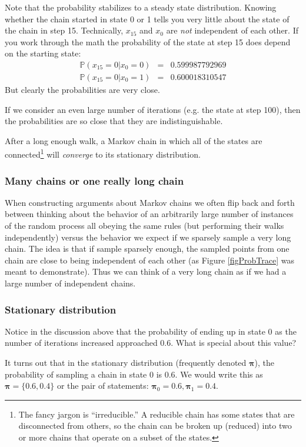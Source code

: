 \documentclass[11pt]{article}
\renewcommand{\Pr}{{\mathbb P}}
\begin{document}
Note that the probability stabilizes to a steady state distribution.
Knowing whether the chain started in state 0 or 1 tells you very little about the state of the chain in step 15.
Technically, $x_{15}$ and $x_0$ are {\em not} independent of each other.
If you work through the math the probability of the state at step 15 does depend on the starting state:
\begin{eqnarray*}
	\Pr(x_{15} = 0 | x_0 = 0) & = & 0.599987792969\\
	\Pr(x_{15} = 0 | x_0 = 1) & = & 0.600018310547
\end{eqnarray*}
But clearly the probabilities are very close.

If we consider an even large number of iterations (e.g. the state at step 100), then the probabilities are so close that they are indistinguishable.

After a long enough walk, a Markov chain in which all of the states are connected\footnote{The fancy jargon is ``irreducible.'' A reducible chain has some states that are disconnected from others, so the chain can be broken up (reduced) into two or more chains that operate on a subset of the states.} will {\em converge} to its stationary distribution.

\subsubsection*{Many chains or one really long chain}
When constructing arguments about Markov chains we often flip back and forth between thinking about the behavior of an arbitrarily large number of instances of the random process all obeying the same rules (but performing their walks independently) versus the behavior we expect if we sparsely sample a very long chain.
The idea is that if sample sparsely enough, the sampled points from one chain are close to being independent of each other (as Figure \ref{figProbTrace} was meant to demonstrate).
Thus we can think of a very long chain as if we had a large number of independent chains.


\subsubsection*{Stationary distribution}
Notice in the discussion above that the probability of ending up in state 0 as the number of iterations increased approached 0.6. What is special about this value?

It turns out that in the stationary distribution (frequently denoted $\bm \pi$), the probability of sampling a chain in state 0 is 0.6.
We would write this as $\bm \pi = \{0.6, 0.4\}$  or the pair of statements: $\bm \pi_0 = 0.6, \bm \pi_1 = 0.4$.
\end{document}
